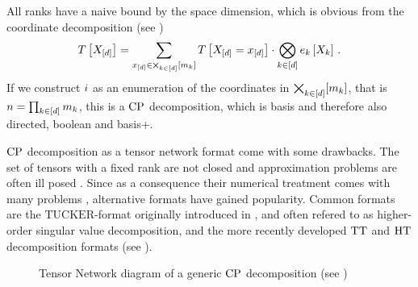 All ranks have a naive bound by the space dimension, which is obvious from the coordinate decomposition (see )
\begin{align*}
    T\left[X_{[d]}\right]
    = \sum_{x_{[d]}\in\bigtimes_{k\in[d]}[m_{k}]} T\left[X_{[d]}=x_{[d]}\right] \cdot \bigotimes_{k\in[d]} e_{k}\left[X_{k}\right] \, .
\end{align*}
If we construct $i$ as an enumeration of the coordinates in $\bigtimes_{k\in[d]}[m_{k}]$, that is $n=\prod_{k\in[d]}m_{k}$, this is a $\mathrm{CP}$ decomposition, which is basis and therefore also directed, boolean and basis+.

%
$\mathrm{CP}$ decomposition as a tensor network format come with some drawbacks.
The set of tensors with a fixed rank are not closed \cite{beylkin_algorithms_2005} and approximation problems are often ill posed \cite{de_silva_tensor_2008}.
Since as a consequence their numerical treatment comes with many problems \cite{espig_variational_2012}, alternative formats have gained popularity.
Common formats are the $\mathrm{TUCKER}$-format originally introduced in \cite{hitchcock_expression_1927}, and often refered to as higher-order singular value decomposition, and the more recently developed $\mathrm{TT}$ and $\mathrm{HT}$ decomposition formats (see ).




\begin{figure}[h]
    \begin{center}
        
    \end{center}
    \caption{Tensor Network diagram of a generic $\mathrm{CP}$ decomposition (see )}
\end{figure}



